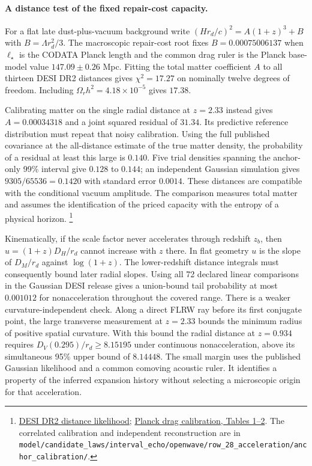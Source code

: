 \documentclass[11pt]{article}
\theoremstyle{remark}
\theoremstyle{plain}
\begin{document}
\paragraph{A distance test of the fixed repair-cost capacity.}
For a flat late dust-plus-vacuum background write
$(Hr_d/c)^2=A(1+z)^3+B$ with $B=\Lambda r_d^2/3$.
The macroscopic repair-cost root fixes $B=0.00075006137$ when
$\ell_\star$ is the CODATA Planck length and the common drag ruler is the
Planck base-model value $147.09\pm0.26$ Mpc. Fitting the total matter
coefficient $A$ to all thirteen DESI DR2 distances gives
$\chi^2=17.27$ on nominally twelve degrees of freedom. Including
$\Omega_r h^2=4.18\times10^{-5}$ gives $17.38$.

Calibrating matter on the single radial distance at $z=2.33$ instead
gives $A=0.00034318$ and a joint squared residual of $31.34$. Its
predictive reference distribution must repeat that noisy calibration.
Using the full published covariance at the all-distance estimate of
the true matter density, the probability of a residual at least this
large is $0.140$. Five trial densities spanning the anchor-only 99\%
interval give $0.128$ to $0.144$; an independent Gaussian simulation
gives $9305/65536=0.1420$ with standard error $0.0014$.
These distances are compatible with the conditional vacuum amplitude.
The comparison measures total matter and assumes the identification
of the priced capacity with the entropy of a physical horizon.%
\footnote{\href{https://arxiv.org/abs/2503.14738}{DESI DR2 distance likelihood};
\href{https://arxiv.org/abs/1807.06209}{Planck drag calibration, Tables 1--2}.
The correlated calibration and independent reconstruction are in
\nolinkurl{model/candidate_laws/interval_echo/openwave/row_28_acceleration/anchor_calibration/}.}

Kinematically, if the scale factor never accelerates through redshift
$z_b$, then $u=(1+z)D_H/r_d$ cannot increase with $z$ there.
In flat geometry $u$ is the slope of $D_M/r_d$ against $\log(1+z)$.
The lower-redshift distance integrals must consequently bound later
radial slopes. Using all 72 declared linear comparisons in the
Gaussian DESI release gives a union-bound tail probability at most
$0.001012$ for nonacceleration throughout the covered range.
There is a weaker curvature-independent check. Along a direct FLRW
ray before its first conjugate point, the large transverse measurement
at $z=2.33$ bounds the minimum radius of positive spatial curvature.
With this bound the radial distance at $z=0.934$ requires
$D_V(0.295)/r_d\ge8.15195$ under continuous nonacceleration,
above its simultaneous 95\% upper bound of $8.14448$. The small
margin uses the published Gaussian likelihood and a common comoving
acoustic ruler. It identifies a property of the inferred expansion
history without selecting a microscopic origin for that acceleration.
\end{document}
